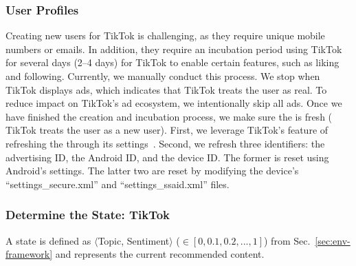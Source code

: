 \subsubsection{User Profiles}
\label{sec:user-profiles-impl}
Creating new users for TikTok is challenging, as they require unique mobile numbers or emails. In addition, they require an incubation period using TikTok for several days (2--4 days) for TikTok to enable certain features, such as liking and following. Currently, we manually conduct this process. We stop when TikTok displays ads, which indicates that TikTok treats the user as real. To reduce  impact on TikTok's ad ecosystem, we intentionally skip all ads.
Once we have finished the creation and incubation process, we make sure the \fyp{} is fresh (\ie{} TikTok treats the user as a new user). First, we leverage TikTok's feature of refreshing the \fyp{} through its settings~\cite{tiktok-refresh-fyp}. Second, we refresh three identifiers: the advertising ID, the Android ID, and the device ID. The former is reset using Android's settings. The latter two are reset by modifying the device's ``settings\_secure.xml'' and ``settings\_ssaid.xml'' files. 




\subsubsection{Determine the State: TikTok}
\label{sec:states-impl}
A state is defined as $\langle$Topic, Sentiment$\rangle$ ($\in [0, 0.1, 0.2, ..., 1]$) from Sec.~\ref{sec:env-framework} and represents the current recommended content. %

